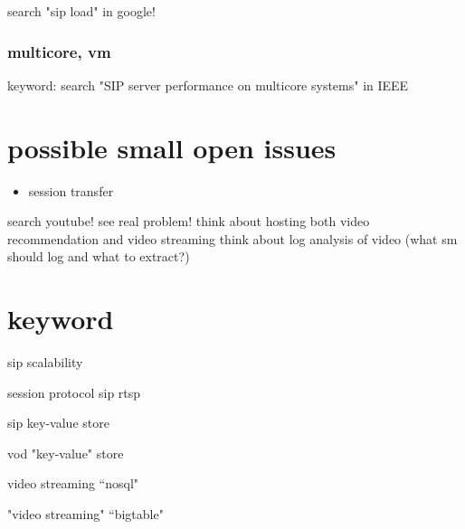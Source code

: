 \documentclass[•]{article}
\begin{document}
search "sip load" in google!

\subsubsection{multicore, vm}
keyword: search "SIP server performance on multicore systems" in IEEE

\section{possible small open issues}
\begin{itemize}
\item session transfer
\end{itemize}

search youtube! see real problem!
think about hosting both video recommendation and video streaming
think about log analysis of video (what sm should log and what to extract?)



\section{keyword}

sip scalability

session protocol sip rtsp

sip key-value store

vod "key-value" store

video streaming “nosql"

"video streaming" “bigtable"




\end{document}
